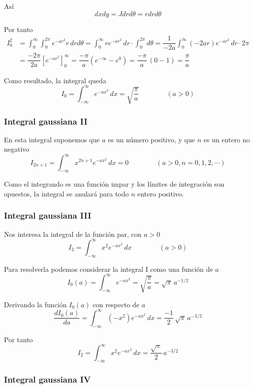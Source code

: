 Así
\[
  dx dy = J dr d\theta = r dr d\theta
\]

Por tanto
\begin{align*}
  I_0^2
  &=
  \int_0^\infty \int_0^{2\pi} e^{-ar^2} r\,dr d\theta
  =
  \int_0^\infty r e^{-ar^2}\,dr \cdot \int_0^{2\pi} d\theta
  =
    \dfrac{1}{-2a}\int_0^\infty(-2ar) e^{-ar^2}\,dr \cdot 2\pi\\
  &=
    \dfrac{-2\pi}{2a}\left[e^{-ar^2}\right]_0^\infty
    =
    \dfrac{-\pi}{a}\left(e^{-\infty}-e^0\right)
    =
    \dfrac{-\pi}{a}\,(0-1)
    =
    \dfrac{\pi}{a}
\end{align*}

Como resultado, la integral queda
\[
  I_0 = \int_{-\infty}^{\infty}e^{-ax^2}\,dx = \sqrt{\dfrac{\pi}{a}}
  \hspace{4em}
  (a>0)
\]

\subsubsection{Integral gaussiana II}

En esta integral suponemos que $a$ es un número positivo, y
que $n$ es un entero no negativo
\[
  I_{2n+1} = \int^{\infty}_{-\infty} x^{2n+1} e^{-ax^2}\,dx = 0
  \hspace{4em}
  (a>0, n=0,1,2,\cdots)
\]

Como el integrando es una función impar y los límites de integración
son opuestos, la integral se anulará para todo $n$ entero positivo.

\subsubsection{Integral gaussiana III}

Nos interesa la integral de la función par, con $a>0$
\[
  I_2 = \int_{-\infty}^{\infty} x^2 e^{-ax^2}\,dx
  \hspace{4em}
  (a>0)
\]

Para resolverla podemos considerar la integral I como una función de $a$
\[
  I_0(a) = \int_{-\infty}^{\infty} e^{-ax^2} = \sqrt{\dfrac{\pi}{a}}
  = \sqrt{\pi}\,a^{-1/2}
\]

Derivando la función $I_0(a)$ con respecto de $a$
\[
  \dfrac{d I_0(a)}{d a}
  =
  \int_{-\infty}^{\infty} (-x^2) e^{-ax^2}\,dx = \dfrac{-1}{2}\,\sqrt{\pi}\,a^{-3/2}
\]

Por tanto
\[
  I_2 = \int_{-\infty}^{\infty} x^2 e^{-ax^2}\,dx = \dfrac{\sqrt{\pi}}{2}\,a^{-3/2}
\]

\subsubsection{Integral gaussiana IV}

